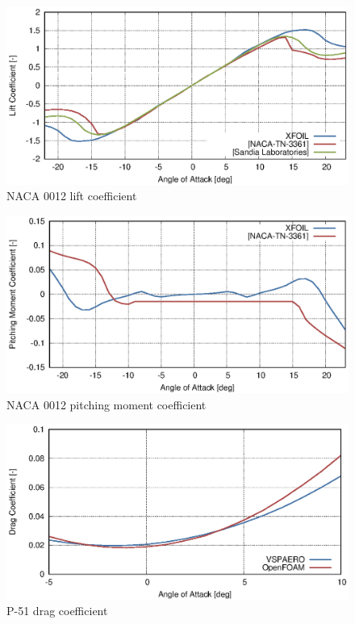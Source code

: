 \begin{figure}
  \centering
  \includegraphics[width=140mm]{eps/xfoil_naca0012_cz.eps}
  \caption{NACA 0012 lift coefficient}
  \label{fig-cfd-result-xfoil-cz}
\end{figure}

\begin{figure}
  \centering
  \includegraphics[width=140mm]{eps/xfoil_naca0012_cm.eps}
  \caption{NACA 0012 pitching moment coefficient}
  \label{fig-cfd-result-xfoil-cm}
\end{figure}

\begin{figure}
  \centering
  \includegraphics[width=140mm]{eps/vspaero_p51_cx.eps}
  \caption{P-51 drag coefficient}
  \label{fig-cfd-result-vspaero-cx}
\end{figure}

